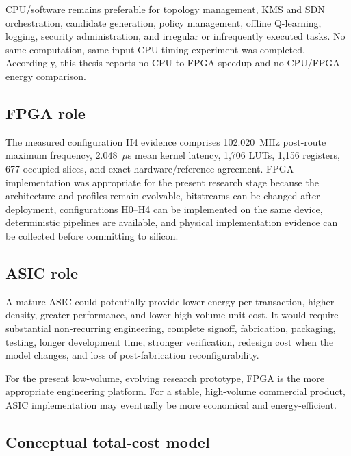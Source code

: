 CPU/software remains preferable for topology management, KMS and SDN orchestration,
candidate generation, policy management, offline Q-learning, logging, security
administration, and irregular or infrequently executed tasks. No same-computation,
same-input CPU timing experiment was completed. Accordingly, this thesis reports no
CPU-to-FPGA speedup and no CPU/FPGA energy comparison.

\subsection{FPGA role}

The measured configuration H4 evidence comprises 102.020~MHz post-route maximum
frequency, 2.048~$\mu$s mean kernel latency, 1,706 LUTs, 1,156 registers, 677
occupied slices, and exact hardware/reference agreement. FPGA implementation was
appropriate for the present research stage because the architecture and profiles
remain evolvable, bitstreams can be changed after deployment, configurations H0--H4
can be implemented on the same device, deterministic pipelines are available, and
physical implementation evidence can be collected before committing to silicon.

\subsection{ASIC role}

A mature ASIC could potentially provide lower energy per transaction, higher
density, greater performance, and lower high-volume unit cost. It would require
substantial non-recurring engineering, complete signoff, fabrication, packaging,
testing, longer development time, stronger verification, redesign cost when the
model changes, and loss of post-fabrication reconfigurability.

For the present low-volume, evolving research prototype, FPGA is the more
appropriate engineering platform. For a stable, high-volume commercial product,
ASIC implementation may eventually be more economical and energy-efficient.

\subsection{Conceptual total-cost model}

